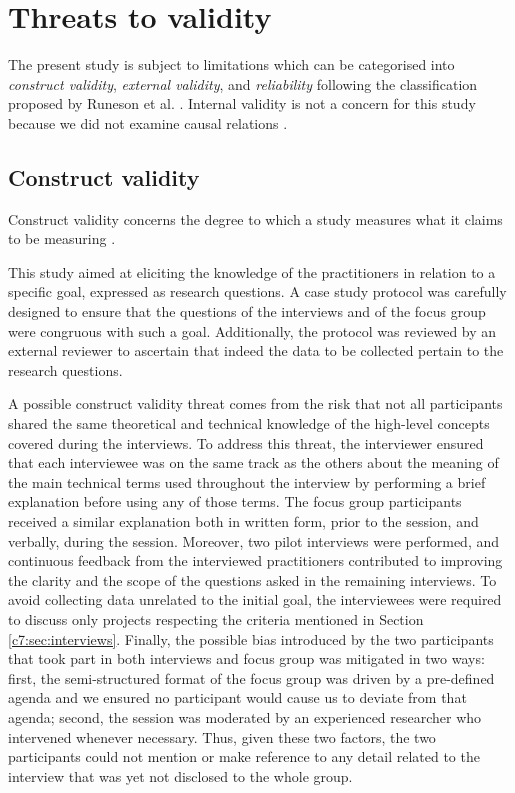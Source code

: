 \section{Threats to validity}\label{c7:sec:threats}
The present study is subject to limitations which can be categorised into \textit{construct validity}, \textit{external validity}, and \textit{reliability} following the classification proposed by Runeson et al. \cite{Runeson2012}.
Internal validity is not a concern for this study because we did not examine causal relations \cite{Runeson2012}.

\subsection{Construct validity}
Construct validity concerns the degree to which a study measures what it claims to be measuring \cite{Runeson2012}.

This study aimed at eliciting the knowledge of the practitioners in relation to a specific goal, expressed as research questions.
A case study protocol was carefully designed to ensure that the questions of the interviews and of the focus group were congruous with such a goal.
Additionally, the protocol was reviewed by an external reviewer to ascertain that indeed the data to be collected pertain to the research questions.

A possible construct validity threat comes from the risk that not all participants shared the same theoretical and technical knowledge of the high-level concepts covered during the interviews.
To address this threat, the interviewer ensured that each interviewee was on the same track as the others about the meaning of the main technical terms used throughout the interview by performing a brief explanation before using any of those terms.
The focus group participants received a similar explanation both in written form, prior to the session, and verbally, during the session.
Moreover, two pilot interviews were performed, and continuous feedback from the interviewed practitioners contributed to improving the clarity and the scope of the questions asked in the remaining interviews.
To avoid collecting data unrelated to the initial goal, the interviewees were required to discuss only projects respecting the criteria mentioned in Section \ref{c7:sec:interviews}. 
Finally, the possible bias introduced by the two participants that took part in both interviews and focus group was mitigated in two ways: first, the semi-structured format of the focus group was driven by a pre-defined agenda and we ensured no participant would cause us to deviate from that agenda; second, the session was moderated by an experienced researcher who intervened whenever necessary. Thus, given these two factors, the two participants could not mention or make reference to any  detail related to the interview that was yet not disclosed to the whole group.


